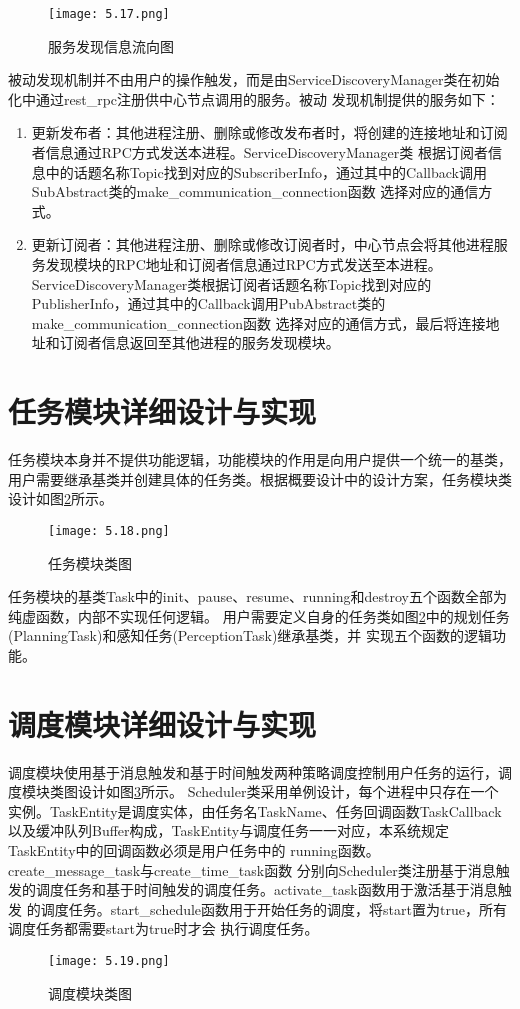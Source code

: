 \begin{figure}[H]
  \centering
  \texttt{[image: 5.17.png]}
  \caption{服务发现信息流向图}
  \label{service_discovery_message_flow}
\end{figure}

被动发现机制并不由用户的操作触发，而是由ServiceDiscoveryManager类在初始化中通过rest\_rpc注册供中心节点调用的服务。被动
发现机制提供的服务如下：
\begin{enumerate}
  \item 更新发布者：其他进程注册、删除或修改发布者时，将创建的连接地址和订阅者信息通过RPC方式发送本进程。ServiceDiscoveryManager类
  根据订阅者信息中的话题名称Topic找到对应的SubscriberInfo，通过其中的Callback调用SubAbstract类的make\_communication\_connection函数
  选择对应的通信方式。
  \item 更新订阅者：其他进程注册、删除或修改订阅者时，中心节点会将其他进程服务发现模块的RPC地址和订阅者信息通过RPC方式发送至本进程。
  ServiceDiscoveryManager类根据订阅者话题名称Topic找到对应的PublisherInfo，通过其中的Callback调用PubAbstract类的make\_communication\_connection函数
  选择对应的通信方式，最后将连接地址和订阅者信息返回至其他进程的服务发现模块。
\end{enumerate}

\section{任务模块详细设计与实现}
任务模块本身并不提供功能逻辑，功能模块的作用是向用户提供一个统一的基类，
用户需要继承基类并创建具体的任务类。根据概要设计中的设计方案，任务模块类设计如图\ref{task_class}所示。
\begin{figure}[H]
  \centering
  \texttt{[image: 5.18.png]}
  \caption{任务模块类图}
  \label{task_class}
\end{figure}
任务模块的基类Task中的init、pause、resume、running和destroy五个函数全部为纯虚函数，内部不实现任何逻辑。
用户需要定义自身的任务类如图\ref{task_class}中的规划任务(PlanningTask)和感知任务(PerceptionTask)继承基类，并
实现五个函数的逻辑功能。

\section{调度模块详细设计与实现}
调度模块使用基于消息触发和基于时间触发两种策略调度控制用户任务的运行，调度模块类图设计如图\ref{schedul_class}所示。
Scheduler类采用单例设计，每个进程中只存在一个实例。TaskEntity是调度实体，由任务名TaskName、任务回调函数TaskCallback
以及缓冲队列Buffer构成，TaskEntity与调度任务一一对应，本系统规定TaskEntity中的回调函数必须是用户任务中的
running函数。
create\_message\_task与create\_time\_task函数
分别向Scheduler类注册基于消息触发的调度任务和基于时间触发的调度任务。activate\_task函数用于激活基于消息触发
的调度任务。start\_schedule函数用于开始任务的调度，将start置为true，所有调度任务都需要start为true时才会
执行调度任务。
\begin{figure}[H]
  \centering
  \texttt{[image: 5.19.png]}
  \caption{调度模块类图}
  \label{schedul_class}
\end{figure}

